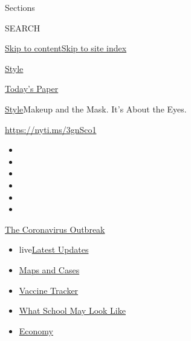 Sections

SEARCH

\protect\hyperlink{site-content}{Skip to
content}\protect\hyperlink{site-index}{Skip to site index}

\href{https://www.nytimes.com/section/style}{Style}

\href{https://myaccount.nytimes.com/auth/login?response_type=cookie\&client_id=vi}{}

\href{https://www.nytimes.com/section/todayspaper}{Today's Paper}

\href{/section/style}{Style}\textbar{}Makeup and the Mask. It's About
the Eyes.

\url{https://nyti.ms/3gnSco1}

\begin{itemize}
\item
\item
\item
\item
\item
\item
\end{itemize}

\href{https://www.nytimes.com/news-event/coronavirus?action=click\&pgtype=Article\&state=default\&region=TOP_BANNER\&context=storylines_menu}{The
Coronavirus Outbreak}

\begin{itemize}
\tightlist
\item
  live\href{https://www.nytimes.com/2020/08/01/world/coronavirus-covid-19.html?action=click\&pgtype=Article\&state=default\&region=TOP_BANNER\&context=storylines_menu}{Latest
  Updates}
\item
  \href{https://www.nytimes.com/interactive/2020/us/coronavirus-us-cases.html?action=click\&pgtype=Article\&state=default\&region=TOP_BANNER\&context=storylines_menu}{Maps
  and Cases}
\item
  \href{https://www.nytimes.com/interactive/2020/science/coronavirus-vaccine-tracker.html?action=click\&pgtype=Article\&state=default\&region=TOP_BANNER\&context=storylines_menu}{Vaccine
  Tracker}
\item
  \href{https://www.nytimes.com/interactive/2020/07/29/us/schools-reopening-coronavirus.html?action=click\&pgtype=Article\&state=default\&region=TOP_BANNER\&context=storylines_menu}{What
  School May Look Like}
\item
  \href{https://www.nytimes.com/live/2020/07/31/business/stock-market-today-coronavirus?action=click\&pgtype=Article\&state=default\&region=TOP_BANNER\&context=storylines_menu}{Economy}
\end{itemize}

